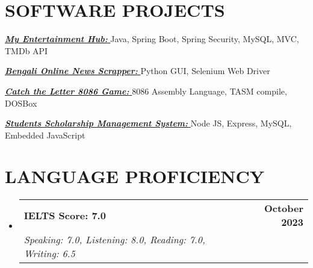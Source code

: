 \documentclass[letterpaper,10.5pt]{article}
\makeatletter
\newcommand{\resumeSubheading}[4]{
  \vspace{-2pt}\item
    \begin{tabular*}{1.0\textwidth}[t]{l@{\extracolsep{\fill}}r}
      \textbf{#1} & \textbf{\small #2} \\
      \textit{\small#3} & \textit{\small #4} \\
    \end{tabular*}\vspace{-7pt}
}
\newcommand{\resumeSubHeadingListStart}{\begin{itemize}[leftmargin=0.0in, label={}]}
\newcommand{\resumeSubHeadingListEnd}{\end{itemize}}
\makeatother
\begin{document}
\vspace{-8pt}
\section{SOFTWARE PROJECTS}
\vspace{-0.5pt}
\begin{itemize}[leftmargin=0in, label={}, parsep=-2pt] {
    \small {
      \item{
                  \href{https://github.com/monirulHaque/myentertainmenthub}{\textbf{\emph{\color{NavyBlue} My Entertainment Hub: }}}Java, Spring Boot, Spring Security, MySQL, MVC, TMDb API}

      \item{
                  \href{https://github.com/monirulHaque/Web-Scrappers-for-Thesis}{\textbf{\emph{\color{NavyBlue} Bengali Online News Scrapper: }}}Python GUI, Selenium Web Driver}

      \item{
                  \href{https://github.com/monirulHaque/Catch-The-Letter-8086-game}{\textbf{\emph{\color{NavyBlue} Catch the Letter 8086 Game: }}}8086 Assembly Language, TASM compile, DOSBox}

      \item{
                  \href{https://github.com/monirulHaque/student_scholarship}{\textbf{\emph{\color{NavyBlue} Students Scholarship Management System: }}}Node JS, Express, MySQL, Embedded JavaScript}
    }}




\end{itemize}
\vspace{-16pt}

\section{LANGUAGE PROFICIENCY}
\vspace{0pt}
\resumeSubHeadingListStart
\resumeSubheading
{IELTS Score: 7.0}{October 2023}
{Speaking: 7.0, Listening: 8.0, Reading: 7.0, Writing: 6.5}{}
\resumeSubHeadingListEnd
\vspace{-8pt}
\end{document}
